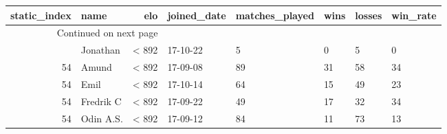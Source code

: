 \begin{longtable}{|r|l|r|l|l|l|l|l|}
\toprule
 static\_index &       name &    elo & joined\_date &  matches\_played &  wins &  losses &  win\_rate \\
\midrule
\endhead
\midrule
\multicolumn{3}{r}{{Continued on next page}} \\
\midrule
\endfoot

\bottomrule
\endlastfoot
           54 &   Jonathan &  < 892 &    17-10-22 &               5 &     0 &       5 &         0 \\
           54 &      Amund &  < 892 &    17-09-08 &              89 &    31 &      58 &        34 \\
           54 &       Emil &  < 892 &    17-10-14 &              64 &    15 &      49 &        23 \\
           54 &  Fredrik C &  < 892 &    17-09-22 &              49 &    17 &      32 &        34 \\
           54 &  Odin A.S. &  < 892 &    17-09-12 &              84 &    11 &      73 &        13 \\
\end{longtable}

